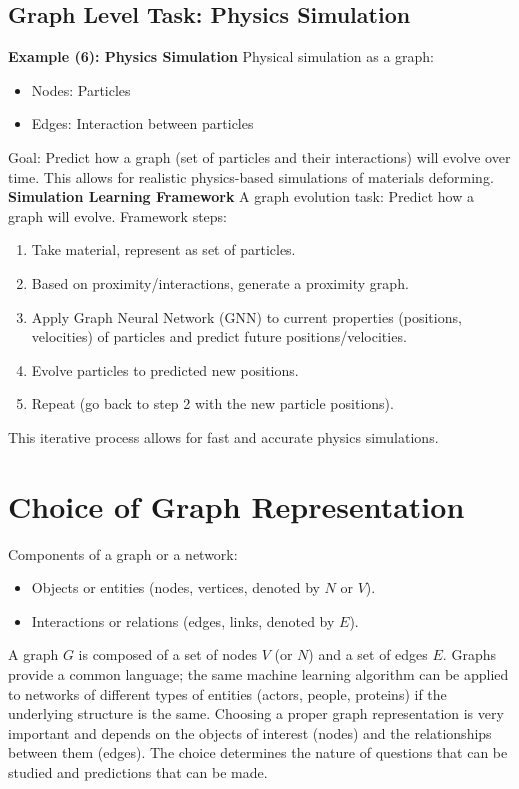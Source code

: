 \documentclass{article}
\begin{document}
\subsection{Graph Level Task: Physics Simulation}
\textbf{Example (6): Physics Simulation}
Physical simulation as a graph:
\begin{itemize}
    \item Nodes: Particles
    \item Edges: Interaction between particles
\end{itemize}
Goal: Predict how a graph (set of particles and their interactions) will evolve over time. This allows for realistic physics-based simulations of materials deforming.
\textbf{Simulation Learning Framework}
A graph evolution task: Predict how a graph will evolve.
Framework steps:
\begin{enumerate}
    \item Take material, represent as set of particles.
    \item Based on proximity/interactions, generate a proximity graph.
    \item Apply Graph Neural Network (GNN) to current properties (positions, velocities) of particles and predict future positions/velocities.
    \item Evolve particles to predicted new positions.
    \item Repeat (go back to step 2 with the new particle positions).
\end{enumerate}
This iterative process allows for fast and accurate physics simulations.
\section{Choice of Graph Representation}
Components of a graph or a network:
\begin{itemize}
    \item Objects or entities (nodes, vertices, denoted by $N$ or $V$).
    \item Interactions or relations (edges, links, denoted by $E$).
\end{itemize}
A graph $G$ is composed of a set of nodes $V$ (or $N$) and a set of edges $E$. Graphs provide a common language; the same machine learning algorithm can be applied to networks of different types of entities (actors, people, proteins) if the underlying structure is the same.
Choosing a proper graph representation is very important and depends on the objects of interest (nodes) and the relationships between them (edges). The choice determines the nature of questions that can be studied and predictions that can be made.
\end{document}
